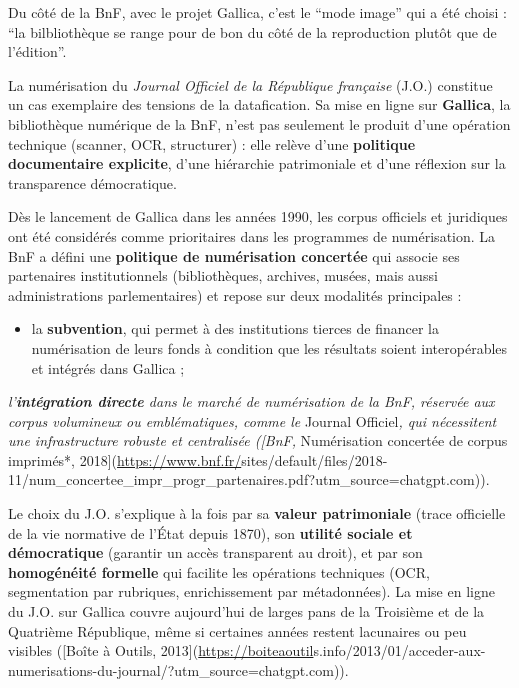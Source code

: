 Du côté de la BnF, avec le projet Gallica, c'est le \enquote{mode image} qui a été choisi : \enquote{la bilbliothèque se range pour de bon du côté de la reproduction plutôt que de l'édition}.

La numérisation du \emph{Journal Officiel de la République française} (J.O.) constitue un cas exemplaire des tensions de la datafication. Sa mise en ligne sur \textbf{Gallica}, la bibliothèque numérique de la BnF, n’est pas seulement le produit d’une opération technique (scanner, OCR, structurer) : elle relève d’une \textbf{politique documentaire explicite}, d’une hiérarchie patrimoniale et d’une réflexion sur la transparence démocratique.

Dès le lancement de Gallica dans les années 1990, les corpus officiels et juridiques ont été considérés comme prioritaires dans les programmes de numérisation. La BnF a défini une \textbf{politique de numérisation concertée} qui associe ses partenaires institutionnels (bibliothèques, archives, musées, mais aussi administrations parlementaires) et repose sur deux modalités principales :

\begin{itemize}
\item la \textbf{subvention}, qui permet à des institutions tierces de financer la numérisation de leurs fonds à condition que les résultats soient interopérables et intégrés dans Gallica ;
\end{itemize}
\emph{ l’\textbf{intégration directe} dans le marché de numérisation de la BnF, réservée aux corpus volumineux ou emblématiques, comme le }Journal Officiel\emph{, qui nécessitent une infrastructure robuste et centralisée ([BnF, }Numérisation concertée de corpus imprimés*, 2018](\url{https://www.bnf.fr/}sites/default/files/2018-11/num_concertee_impr_progr_partenaires.pdf?utm_source=chatgpt.com)).

Le choix du J.O. s’explique à la fois par sa \textbf{valeur patrimoniale} (trace officielle de la vie normative de l’État depuis 1870), son \textbf{utilité sociale et démocratique} (garantir un accès transparent au droit), et par son \textbf{homogénéité formelle} qui facilite les opérations techniques (OCR, segmentation par rubriques, enrichissement par métadonnées). La mise en ligne du J.O. sur Gallica couvre aujourd’hui de larges pans de la Troisième et de la Quatrième République, même si certaines années restent lacunaires ou peu visibles ([Boîte à Outils, 2013](\url{https://boiteaoutil}s.info/2013/01/acceder-aux-numerisations-du-journal/?utm_source=chatgpt.com)).

